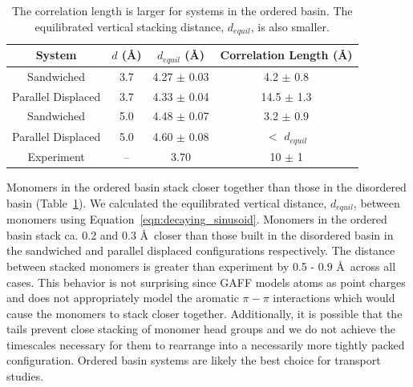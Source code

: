 \documentclass[journal=jpcbfk,manusciprt=article]{achemso}
\begin{document}
  \begin{table}[h]
  \centering
  \begin{tabular}{cccc}
  \toprule
  System             & $\mathit{d}$ (\AA) & $\mathit{d}_{equil}$ (\AA) & Correlation Length (\AA) \\
  \midrule
  Sandwiched         & 3.7                &    4.27 $\pm$ 0.03         & 4.2 $\pm$ 0.8            \\
  Parallel Displaced & 3.7                &    4.33 $\pm$ 0.04         & 14.5 $\pm$ 1.3           \\ 
  Sandwiched         & 5.0                &    4.48 $\pm$ 0.07         & 3.2 $\pm$ 0.9            \\
  Parallel Displaced & 5.0                &    4.60 $\pm$ 0.08         & $<$ $d_{equil}$ \\ 
  Experiment         & --                 &    3.70                    & 10 $\pm$ 1               \\
  \bottomrule
  \end{tabular}
  \caption{The correlation length is larger for systems in the ordered basin. The equilibrated vertical
  stacking distance, $\mathit{d}_{equil}$, is also smaller.}
  \label{table:correlation_length}
  \end{table}

  Monomers in the ordered basin stack closer together than those in the disordered basin
  (Table~\ref{table:correlation_length}). We calculated the equilibrated vertical distance,
  $\mathit{d}_{equil}$, between monomers using Equation~\ref{eqn:decaying_sinusoid}. 
  Monomers in the ordered basin stack ca. 0.2 and 0.3 \AA~closer than those built in the 
  disordered basin in the sandwiched and parallel displaced configurations respectively. 
  The distance between stacked monomers is greater than experiment by 0.5 - 0.9 \AA~across all 
  cases. This behavior is not surprising since GAFF models atoms as point charges and does not 
  appropriately model the aromatic $\pi-\pi$ interactions which would cause the monomers to 
  stack closer together. Additionally, it is possible that the tails prevent close stacking of
  monomer head groups and we do not achieve the timescales necessary for them to rearrange into
  a necessarily more tightly packed configuration. Ordered basin systems are likely the best 
  choice for transport studies. 
  
  
\end{document}
